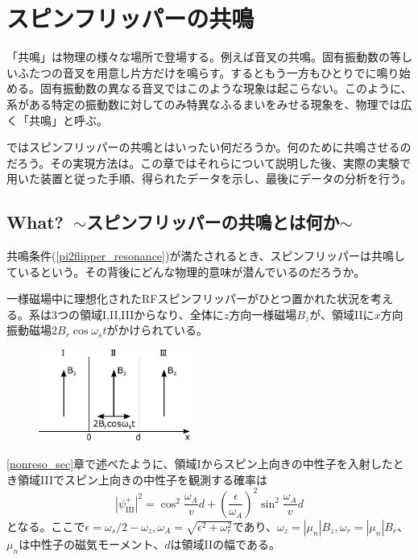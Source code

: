 \section{スピンフリッパーの共鳴}\label{resonance_sec}

「共鳴」は物理の様々な場所で登場する。例えば音叉の共鳴。固有振動数の等しいふたつの音叉を用意し片方だけを鳴らす。するともう一方もひとりでに鳴り始める。固有振動数の異なる音叉ではこのような現象は起こらない。このように、系がある特定の振動数に対してのみ特異なふるまいをみせる現象を、物理では広く「共鳴」と呼ぶ。

ではスピンフリッパーの共鳴とはいったい何だろうか。何のために共鳴させるのだろう。その実現方法は。この章ではそれらについて説明した後、実際の実験で用いた装置と従った手順、得られたデータを示し、最後にデータの分析を行う。

\subsection{What?\ $\sim$スピンフリッパーの共鳴とは何か$\sim$} \label{Resonance_what}
共鳴条件(\ref{pi2flipper_resonance})が満たされるとき、スピンフリッパーは共鳴しているという。その背後にどんな物理的意味が潜んでいるのだろうか。

一様磁場中に理想化されたRFスピンフリッパーがひとつ置かれた状況を考える。系は3つの領域I,II,IIIからなり、全体に$z$方向一様磁場$B_z$が、領域IIに$x$方向振動磁場$2B_r \cos \omega_s t$がかけられている。
\begin{figure}[h]
\centering
\includegraphics[height=3cm]{resonance/whatwhyhow/Resonance_what_setting.pdf}
\end{figure}

\ref{nonreso_sec}章で述べたように、領域Iからスピン上向きの中性子を入射したとき領域IIIでスピン上向きの中性子を観測する確率は
\begin{equation}
|\psi_{\mathrm{III}}^+|^2=\cos^2 \frac{\omega_A}{v}d+\left(\frac{\epsilon}{\omega_A}\right)^2\sin^2\frac{\omega_A}{v}d \label{Resonance_flip}
\end{equation}
となる。ここで$\epsilon=\omega_s/2-\omega_z,\omega_A=\sqrt{\epsilon^2+\omega_r^2}$であり、$\omega_z=|\mu_n|B_z,\omega_r=|\mu_n|B_r$、$\mu_n$は中性子の磁気モーメント、$d$は領域IIの幅である。

